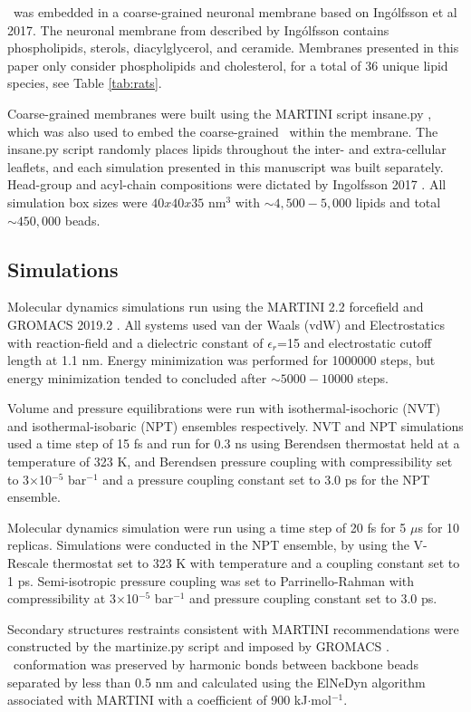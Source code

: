 \nachr~was embedded in a coarse-grained neuronal membrane based on Ing{\'o}lfsson et al 2017. The neuronal membrane from described by Ing{\'o}lfsson contains phospholipids, sterols, diacylglycerol, and ceramide. Membranes presented in this paper only consider phospholipids and cholesterol, for a total of 36 unique lipid species, see Table \ref{tab:rats}.

Coarse-grained membranes were built using the MARTINI script insane.py \cite{Wassenaar2015}, which was also used to embed the coarse-grained \nachr~within the membrane. The insane.py script randomly places lipids throughout the inter- and extra-cellular leaflets, and each simulation presented in this manuscript was built separately. Head-group and  acyl-chain compositions were dictated by Ingolfsson 2017 \cite{Ingolfsson2017b}. All simulation box sizes were $40x40x35$ nm$^3$ with  $\sim 4,500-5,000$ lipids and total $\sim450,000$ beads.

\subsection{Simulations}

Molecular dynamics simulations run using the MARTINI 2.2\cite{DeJong2012} forcefield and GROMACS\cite{Berendsen1995,Abraham2015}  2019.2 . All systems used van der Waals (vdW) and Electrostatics with reaction-field and a dielectric constant of $\epsilon_r$=15 and electrostatic cutoff length at 1.1 nm. Energy minimization was performed for 1000000 steps, but energy minimization tended to concluded after $\sim 5000-10000$ steps.

Volume and pressure equilibrations were run with isothermal-isochoric (NVT) and isothermal-isobaric (NPT) ensembles respectively. NVT and NPT simulations used a time step of 15 fs and run for 0.3 ns using Berendsen thermostat held at a temperature of 323 K, and Berendsen pressure coupling with compressibility set to 3$\times$10$^{-5}$ bar$^{-1}$ and a pressure coupling constant set to 3.0 ps  for the NPT ensemble. 

Molecular dynamics simulation were run using a time step of 20 fs for 5 $\mu$s for 10 replicas. Simulations were conducted in the NPT ensemble, by using the V-Rescale thermostat set to 323 K with temperature and a coupling constant set to 1 ps. Semi-isotropic pressure coupling was set to Parrinello-Rahman with compressibility at 3$\times$10$^{-5}$ bar$^{-1}$ and pressure coupling constant set to 3.0 ps. 

Secondary structures restraints consistent with MARTINI recommendations were constructed by the martinize.py \cite{DeJong2012} script and imposed by GROMACS \cite{Berendsen1995,Abraham2015}. \nachr~conformation was preserved by harmonic bonds between backbone beads separated by less than 0.5 nm and calculated using the ElNeDyn algorithm \cite{Periole2009} associated with MARTINI \cite{DeJong2012} with a coefficient of 900 kJ$\cdot$mol$^{-1}$.

